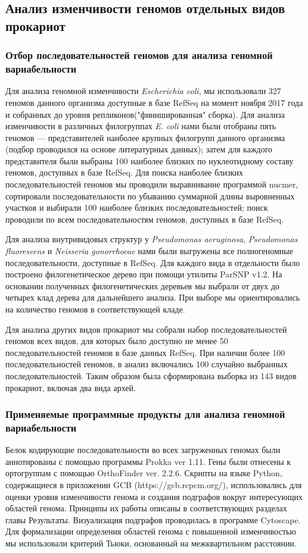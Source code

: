 \subsection*{Анализ изменчивости геномов отдельных видов прокариот}
\subsubsection*{Отбор последовательностей геномов для анализа геномной вариабельности}
Для анализа геномной изменчивости \textit{Escherichia coli}, мы использовали 327 геномов данного организма доступные в базе RefSeq на момент ноября 2017 года и собранных до уровня репликонов("финишированная" сборка). Для анализа изменчивости в различных филогруппах \textit{E. coli} нами были отобраны пять геномов --- представителей наиболее крупных филогрупп данного организма (подбор проводился на основе литературных данных); затем для каждого представителя были выбраны 100 наиболее близких по нуклеотидному составу геномов, доступных в базе RefSeq. Для поиска наиболее близких последовательностей геномов мы проводили выравнивание программой nucmer, сортировали последовательности по убыванию суммарной длины выровненных участков и выбирали 100 наиболее близких последовательностей; поиск проводили по всем последовательностям геномов, доступных в базе RefSeq. 

Для анализа внутривидовых структур у \textit{Pseudomonas aeruginosa}, \textit{Pseudomonas fluorescens} и \textit{Neisseria gonorrhoeae} нами были выгружены все полногеномные последовательности, доступные в RefSeq. Для каждого вида в отдельности было построено филогенетическое дерево при помощи утилиты ParSNP v1.2. На основании полученных филогенетических деревьев мы выбрали от двух до четырех клад дерева для дальнейшего анализа. При выборе мы ориентировались на количество геномов в соответствующей кладе. 

Для анализа других видов прокариот мы собрали набор последовательностей геномов всех видов, для которых было доступно не менее 50 последовательностей геномов в базе данных RefSeq. При наличии более 100 последовательностей геномов, в анализ включались 100 случайно выбранных последовательностей. Таким образом была сформирована выборка из 143 видов прокариот, включая два вида архей.

\subsubsection*{Применяемые программные продукты для анализа геномной вариабельности}
Белок кодирующие последовательности во всех загруженных геномах были аннотированы с помощью программы Prokka ver 1.11. Гены были отнесены к ортогруппам с помощью OrthoFinder ver. 2.2.6. Скрипты на языке Python, содержащиеся в приложении GCB (https://gcb.rcpcm.org/), использовались для оценки уровня изменчивости генома и создания подграфов вокруг интересующих областей генома. Принципы их работы описаны в соответствующих разделах главы Результаты. Визуализация подграфов проводилась в программе Cytoscape. Для формализации определения областей генома с повышенной изменчивостью мы использовали критерий Тьюки, основанный на межквартильном расстоянии.


